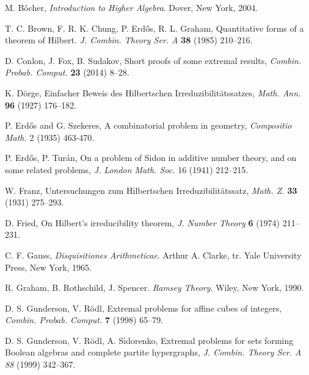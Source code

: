 \documentclass{article}
\theoremstyle{plain}
\theoremstyle{definition}
\begin{document}

\begin{thebibliography}{26}

M. B\^ocher,
\textit{Introduction to Higher Algebra}.
Dover, New York, 2004.

T. C. Brown, F. R. K. Chung, P. Erd\H{o}s, R. L. Graham,
Quantitative forms of a theorem of Hilbert.
\textit{J. Combin. Theory Ser. A} \textbf{38} (1985) 210--216.

D. Conlon, J. Fox, B. Sudakov,
Short proofs of some extremal results,
\textit{Combin. Probab. Comput.} \textbf{23} (2014) 8--28.

K. D{\"o}rge,
Einfacher Beweis des Hilbertschen Irreduzibilit\"atssatzes,
\textit{Math. Ann.} \textbf{96} (1927) 176--182.

P. Erd\H{o}s and G. Szekeres,
A combinatorial problem in geometry,
\textit{Compositio Math.} 2 (1935) 463-470.







P. Erd\H{o}s, P. Tur\'an,
On a problem of Sidon in additive number theory, and on some related
problems,
\textit{J. London Math. Soc.} 16 (1941) 212--215.

W. Franz,
Untersuchungen zum Hilbertschen Irreduzibilit\"atssatz,
\textit{Math. Z.} \textbf{33} (1931) 275--293.

D. Fried,
On Hilbert's irreducibility theorem,
\textit{J. Number Theory} \textbf{6} (1974) 211--231.


C. F. Gauss,
\textit{Disquisitiones Arithmeticae}.
Arthur A. Clarke, tr.
Yale University Press, New York, 1965.



R. Graham, B. Rothschild, J. Spencer.
\textit{Ramsey Theory}.
Wiley, New York, 1990.

D. S. Gunderson, V. R\"odl,
Extremal problems for affine cubes of integers,
\textit{Combin. Probab. Comput.} \textbf{7} (1998) 65--79.

D. S. Gunderson, V. R\"odl, A. Sidorenko,
Extremal problems for sets forming Boolean algebras and complete
partite hypergraphs,
\textit{J. Combin. Theory Ser. A} \textit{88} (1999) 342--367.


\end{thebibliography}
\end{document}
